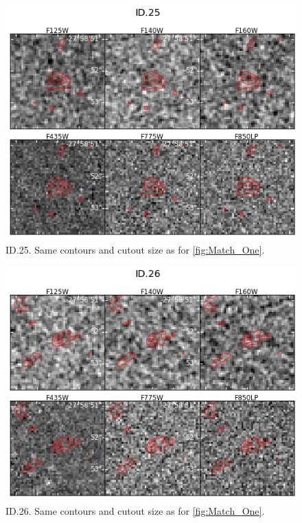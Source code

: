 \begin{figure}[tbp]
\centering \includegraphics[width=160mm]{Matched/ASPECS_Cutout_24.jpg}
\caption{ID.25. Same contours and cutout size as for \ref{fig:Match_One}.}
\label{fig:Match_Three}
\end{figure}

\begin{figure}[tbp]
\centering \includegraphics[width=160mm]{Matched/ASPECS_Cutout_25.jpg}
\caption{ID.26. Same contours and cutout size as for \ref{fig:Match_One}.}
\label{fig:Match_Three}
\end{figure}

